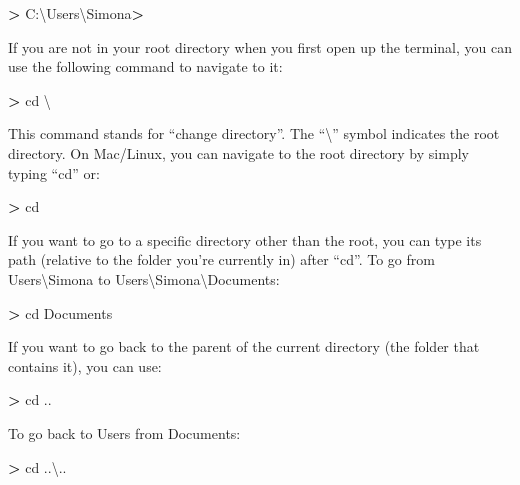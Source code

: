 \documentclass[
]{book}
\newenvironment{Shaded}{\begin{snugshade}}{\end{snugshade}}
\newcommand{\BuiltInTok}[1]{#1}
\newcommand{\ExtensionTok}[1]{#1}
\newcommand{\NormalTok}[1]{#1}
\newcommand{\OperatorTok}[1]{\textcolor[rgb]{0.81,0.36,0.00}{\textbf{#1}}}
\begin{document}
\begin{Shaded}
\begin{Highlighting}[]
\OperatorTok{>} \ExtensionTok{C}\NormalTok{:\textbackslash{}Users\textbackslash{}Simona}\OperatorTok{>}
\end{Highlighting}
\end{Shaded}

If you are not in your root directory when you first open up the terminal, you can use the following command to navigate to it:

\begin{Shaded}
\begin{Highlighting}[]
\OperatorTok{>} \BuiltInTok{cd}\NormalTok{ \textbackslash{}}
\end{Highlighting}
\end{Shaded}

This command stands for ``change directory''. The ``\textbackslash{}'' symbol indicates the root directory. On Mac/Linux, you can navigate to the root directory by simply typing ``cd'' or:

\begin{Shaded}
\begin{Highlighting}[]
\OperatorTok{>} \BuiltInTok{cd}\NormalTok{ ~}
\end{Highlighting}
\end{Shaded}

If you want to go to a specific directory other than the root, you can type its path (relative to the folder you're currently in) after ``cd''. To go from Users\textbackslash Simona to Users\textbackslash Simona\textbackslash Documents:

\begin{Shaded}
\begin{Highlighting}[]
\OperatorTok{>} \BuiltInTok{cd}\NormalTok{ Documents}
\end{Highlighting}
\end{Shaded}

If you want to go back to the parent of the current directory (the folder that contains it), you can use:

\begin{Shaded}
\begin{Highlighting}[]
\OperatorTok{>} \BuiltInTok{cd}\NormalTok{ ..}
\end{Highlighting}
\end{Shaded}

To go back to Users from Documents:

\begin{Shaded}
\begin{Highlighting}[]
\OperatorTok{>} \BuiltInTok{cd}\NormalTok{ ..\textbackslash{}..}
\end{Highlighting}
\end{Shaded}
\end{document}
